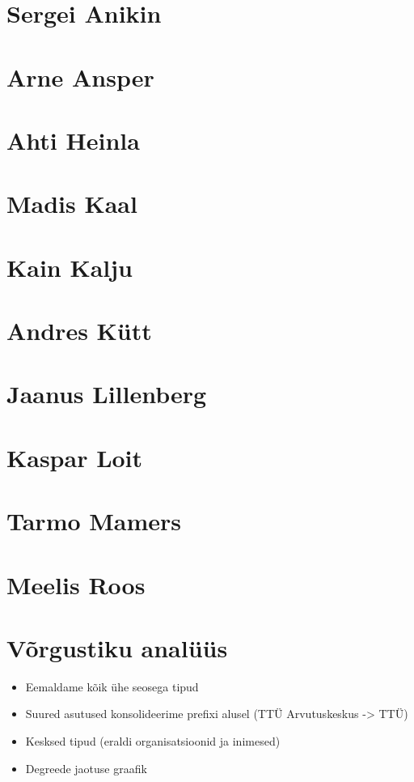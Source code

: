 \documentclass{tufte-book}
\let\oldchapter\chapter
\def\chapter{%
  \setcounter{footnote}{0}%
  \oldchapter
}
\begin{document}
\chapter{Sergei Anikin}


\chapter{Arne Ansper}


\chapter{Ahti Heinla}


\chapter{Madis Kaal}


\chapter{Kain Kalju}


\chapter{Andres Kütt}


\chapter{Jaanus Lillenberg}


\chapter{Kaspar Loit}


\chapter{Tarmo Mamers}


\chapter{Meelis Roos}



\chapter{Võrgustiku analüüs}
\begin{itemize}
	\item Eemaldame kõik ühe seosega tipud
	\item Suured asutused konsolideerime prefixi alusel (TTÜ Arvutuskeskus -> TTÜ)
	\item Kesksed tipud (eraldi organisatsioonid ja inimesed)
	\item Degreede jaotuse graafik
\end{itemize}
\end{document}
